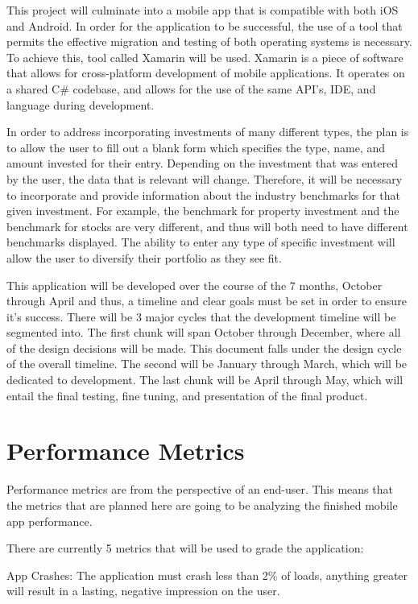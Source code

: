 \documentclass[onecolumn, draftclsnofoot,10pt, compsoc]{IEEEtran}
\begin{document}
This project will culminate into a mobile app that is compatible with both iOS and Android. In order for the application to be successful, the use of a tool that permits the effective migration and testing of both operating systems is necessary. To achieve this, tool called Xamarin will be used. Xamarin is a piece of software that allows for cross-platform development of mobile applications. It operates on a shared C# codebase, and allows for the use of the same API’s, IDE, and language during development. 

In order to address incorporating investments of many different types, the plan is to allow the user to fill out a blank form which specifies the type, name, and amount invested for their entry. Depending on the investment that was entered by the user, the data that is relevant will change. Therefore, it will be necessary to incorporate and provide information about the industry benchmarks for that given investment. For example, the benchmark for property investment and the benchmark for stocks are very different, and thus will both need to have different benchmarks displayed. The ability to enter any type of specific investment will allow the user to diversify their portfolio as they see fit.

This application will be developed over the course of the 7 months, October through April and thus, a timeline and clear goals must be set in order to ensure it’s success. There will be 3 major cycles that the development timeline will be segmented into. The first chunk will span October through December, where all of the design decisions will be made. This document falls under the design cycle of the overall timeline. The second will be January through March, which will be dedicated to development. The last chunk will be April through May, which will entail the final testing,  fine tuning, and presentation of the final product.

\section{Performance Metrics}
Performance metrics are from the perspective of an end-user. This means that the metrics that are planned here are  going to be analyzing the finished mobile app performance. 

There are currently 5 metrics that will be used to grade the application:

	App Crashes:  The application must crash less than 2\% of loads, anything greater will result in a lasting, negative impression on the user.
	
\end{document}
